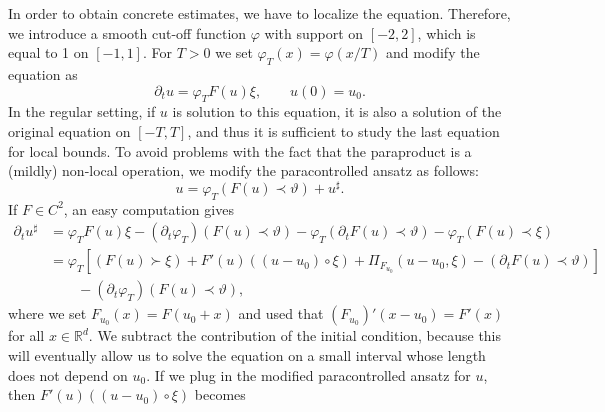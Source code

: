 \documentclass[11pt,a4paper]{article}
\theoremstyle{remark}
\newcommand{\R}{\mathbb{R}}
\begin{document}
In order to obtain concrete estimates,
we have to localize the equation. Therefore, we introduce a smooth cut-off
function $\varphi$ with support on $[ -2,2 ]$, which is equal to 1 on $[ -1,1]$. For $T>0$ we set $\varphi_{T} ( x ) = \varphi ( x/T )$ and modify the equation as
\[
   \partial_{t} u= \varphi_{T} F ( u ) \xi, \qquad u(0) = u_0.
\]
In the regular setting, if $u$ is solution to this equation, it is also a
solution of the original equation on $[ -T,T ]$, and thus it is sufficient to
study the last equation for local bounds. To avoid problems with the fact
that the paraproduct is a (mildly) non-local operation, we modify the
paracontrolled ansatz as follows:
\begin{equation}\label{eq:ode paracontrolled ansatz localized}
   u= \varphi_{T} ( F ( u )\prec \vartheta ) +u^{\sharp}.
\end{equation}
If $F \in C^2$, an easy computation gives
\begin{align*}
   \partial_{t} u^{\sharp} & = \varphi_{T} F ( u ) \xi - ( \partial_{t} \varphi_{T} )  ( F ( u ) \prec \vartheta ) - \varphi_{T}  ( \partial_{t} F( u ) \prec \vartheta ) - \varphi_{T} ( F ( u ) \prec \xi )\\
   & = \varphi_{T} \left[ ( F ( u ) \succ \xi ) +F' ( u )  ( ( u-u_{0} ) \circ \xi ) + \Pi_{F_{u_{0}}} ( u-u_{0} , \xi ) - ( \partial_{t} F ( u ) \prec \vartheta ) \right] \\
   &\qquad - ( \partial_{t} \varphi_{T} )  ( F ( u ) \prec \vartheta ) ,
\end{align*}
where we set $F_{u_{0}} ( x ) =F ( u_{0} +x )$ and used that $( F_{u_{0}} )' (x-u_{0} ) =F' ( x )$ for all $x \in \R^d$. We subtract the contribution of the initial condition,
because this will eventually allow us to solve the equation on a small
interval whose length does not depend on $u_0$. If we plug in
the modified paracontrolled ansatz for $u$, then $F' ( u ) ( ( u-u_{0} ) \circ \xi )$ becomes
\end{document}
